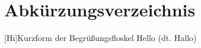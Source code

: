 \section*{Abkürzungsverzeichnis}


\begin{acronym}
    [Hi]{Kurzform der Begrüßungsfloskel Hello (dt. Hallo)}
\end{acronym}